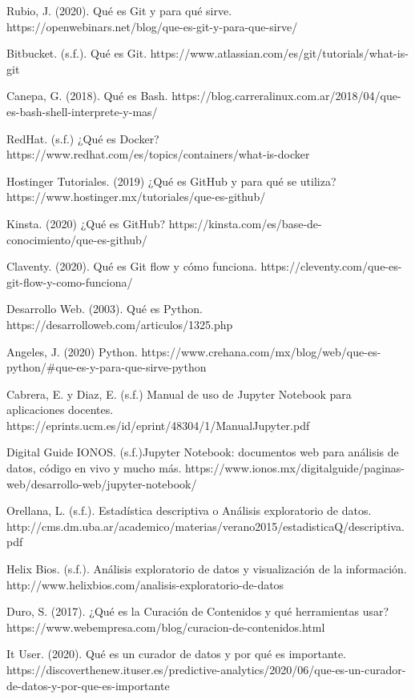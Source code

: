 \documentclass[12pt,letterpaper]{article}
\begin{document}
\begin{thebibliography}{99}

 Rubio, J. (2020). Qu\'e es Git y para qu\'e sirve. https://openwebinars.net/blog/que-es-git-y-para-que-sirve/

 Bitbucket. (s.f.). Qué es Git. https://www.atlassian.com/es/git/tutorials/what-is-git

 Canepa, G. (2018). Qué es Bash. https://blog.carreralinux.com.ar/2018/04/que-es-bash-shell-interprete-y-mas/

 RedHat. (s.f.) ¿Qué es Docker? https://www.redhat.com/es/topics/containers/what-is-docker

  Hostinger Tutoriales. (2019) ¿Qué es GitHub y para qué se utiliza? https://www.hostinger.mx/tutoriales/que-es-github/

 Kinsta. (2020) ¿Qué es GitHub? https://kinsta.com/es/base-de-conocimiento/que-es-github/

 Claventy. (2020). Qué es Git flow y cómo funciona. https://cleventy.com/que-es-git-flow-y-como-funciona/

 Desarrollo Web. (2003). Qué es Python. https://desarrolloweb.com/articulos/1325.php

 Angeles, J. (2020) Python. https://www.crehana.com/mx/blog/web/que-es-python/\#que-es-y-para-que-sirve-python 

 Cabrera, E. y Diaz, E. (s.f.) Manual de uso de Jupyter Notebook para aplicaciones docentes. 
https://eprints.ucm.es/id/eprint/48304/1/ManualJupyter.pdf

 Digital Guide IONOS. (s.f.)Jupyter Notebook: documentos web para análisis de datos, código en vivo y mucho más. https://www.ionos.mx/digitalguide/paginas-web/desarrollo-web/jupyter-notebook/

 Orellana, L. (s.f.). Estadística descriptiva o Análisis exploratorio de datos. http://cms.dm.uba.ar/academico/materias/verano2015/estadisticaQ/descriptiva.pdf

 Helix Bios. (s.f.). Análisis exploratorio de datos y visualización de la información. http://www.helixbios.com/analisis-exploratorio-de-datos

 Duro, S. (2017). ¿Qué es la Curación de Contenidos y qué herramientas usar? https://www.webempresa.com/blog/curacion-de-contenidos.html

 It User. (2020). Qué es un curador de datos y por qué es importante. https://discoverthenew.ituser.es/predictive-analytics/2020/06/que-es-un-curador-de-datos-y-por-que-es-importante

\end{thebibliography} 
\end{document}
